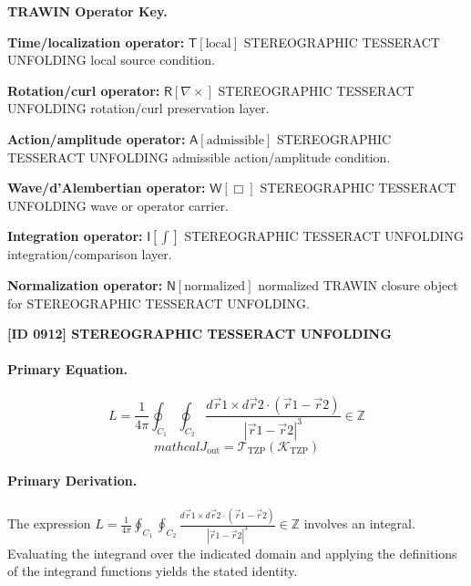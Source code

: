 \par\vspace{0.45\baselineskip}
\noindent\begin{minipage}[t]{\linewidth}
\begingroup
\small
\raggedright
\textbf{TRAWIN Operator Key.}\par
\noindent\textbf{Time/localization operator:} $\mathsf{T}\!\left[\mathrm{local}\right]$ STEREOGRAPHIC TESSERACT UNFOLDING local source condition.\par
\noindent\textbf{Rotation/curl operator:} $\mathsf{R}\!\left[\nabla\times\right]$ STEREOGRAPHIC TESSERACT UNFOLDING rotation/curl preservation layer.\par
\noindent\textbf{Action/amplitude operator:} $\mathsf{A}\!\left[\mathrm{admissible}\right]$ STEREOGRAPHIC TESSERACT UNFOLDING admissible action/amplitude condition.\par
\noindent\textbf{Wave/d'Alembertian operator:} $\mathsf{W}\!\left[\Box\right]$ STEREOGRAPHIC TESSERACT UNFOLDING wave or operator carrier.\par
\noindent\textbf{Integration operator:} $\mathsf{I}\!\left[\int\right]$ STEREOGRAPHIC TESSERACT UNFOLDING integration/comparison layer.\par
\noindent\textbf{Normalization operator:} $\mathsf{N}\!\left[\mathrm{normalized}\right]$ normalized TRAWIN closure object for STEREOGRAPHIC TESSERACT UNFOLDING.\par
\endgroup
\end{minipage}

\clearpage
\noindent\textbf{[ID 0912] STEREOGRAPHIC TESSERACT UNFOLDING}\par
\vspace{0.35em}
\paragraph{Primary Equation.}
\[
L = \frac{1}{4\pi}\oint_{C_{1}}\oint_{C_{2}}\frac{d\vec{r} {1}\times d\vec{r} {2}\cdot(\vec{r} {1}-\vec{r} {2})}{|\vec{r} {1}-\vec{r} {2}|^{3}} \in \mathbb{Z}
\]
\[
mathcal{J}_{\mathrm{out}} = \mathcal{T}_{\mathrm{TZP}}\!\left(\mathcal{K}_{\mathrm{TZP}}\right)
\]

\paragraph{Primary Derivation.}
The expression \( L = \frac{1}{4\pi}\oint_{C_{1}}\oint_{C_{2}}\frac{d\vec{r} {1}\times d\vec{r} {2}\cdot(\vec{r} {1}-\vec{r} {2})}{|\vec{r} {1}-\vec{r} {2}|^{3}} \in \mathbb{Z} \) involves an integral. Evaluating the integrand over the indicated domain and applying the definitions of the integrand functions yields the stated identity.
